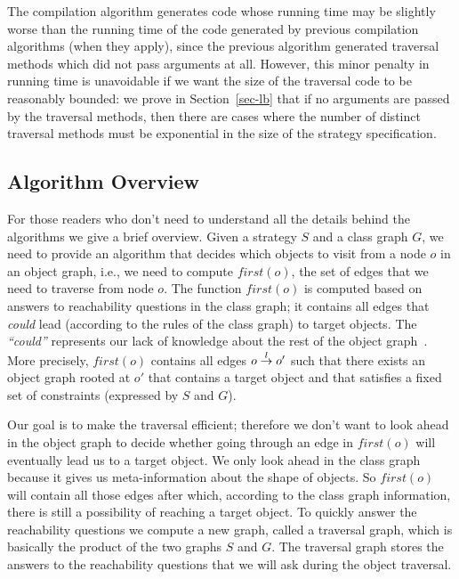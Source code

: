The compilation algorithm generates code whose running time may be
slightly worse than the running time of the code generated by previous
compilation algorithms (when they apply), since the previous algorithm
generated traversal methods which did not pass arguments at
all. However, this minor penalty in running time is unavoidable if we
want the size of the traversal code to be reasonably bounded: we prove
in Section~\ref{sec-lb} that if no arguments are passed by the
traversal methods, then there are cases where the number of distinct
traversal methods must be exponential in the size of the strategy
specification.

\subsection{Algorithm Overview}
\label{alg-overview}

\newcommand{\first}{\mathit{first}}

For those readers who don't need to understand all the details behind
the algorithms we give a brief overview. Given a strategy $S$ and a
class graph $G$, we need to provide an algorithm that decides which
objects to visit from a node $o$ in an object graph, i.e., we need to
compute $\first(o)$, the set of edges that we need to traverse from
node $o$. The function $\first(o)$ is computed based on answers to
reachability questions in the class graph; it contains all edges that
{\em could} lead (according to the rules of the class graph) to target
objects.  The {\em ``could''} represents our lack of knowledge about
the rest of the object graph~\cite{mitch:karl-2000}.  More precisely,
$\first(o)$ contains all edges $o\stackrel{l}{\rightarrow}o'$ such that there exists
an object graph rooted at $o'$ that contains a target object and
that satisfies a fixed set of constraints (expressed by $S$ and $G$).

Our goal is to make the traversal efficient; therefore we don't want
to look ahead in the object graph to decide whether going through an
edge in $\first(o)$ will eventually lead us to a target object.  We
only look ahead in the class graph because it gives us
meta-information about the shape of objects. So $\first(o)$ will
contain all those edges after which, according to the class graph
information, there is still a possibility of reaching a target object.
To quickly answer the reachability questions we compute a new graph,
called a traversal graph, which is basically the product of the two
graphs $S$ and $G$. The traversal graph stores the answers to the
reachability questions that we will ask during the object traversal.

